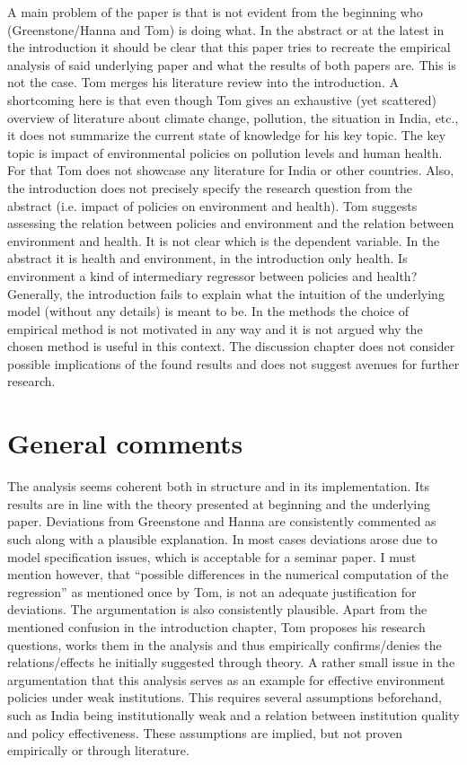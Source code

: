 \documentclass[11pt]{article}
\begin{document}
A main problem of the paper is that is not evident from the beginning who (Greenstone/Hanna and Tom) is doing what. In the abstract or at the latest in the introduction it should be clear that this paper tries to recreate the empirical analysis of said underlying paper and what the results of both papers are. This is not the case. 
Tom merges his literature review into the introduction. A shortcoming here is that even though Tom gives an exhaustive (yet scattered) overview of literature about climate change, pollution, the situation in India, etc., it does not summarize the current state of knowledge for his key topic. The key topic is impact of environmental policies on pollution levels and human health. For that Tom does not showcase any literature for India or other countries. 
Also, the introduction does not precisely specify the research question from the abstract (i.e. impact of policies on environment and health). Tom suggests assessing the relation between policies and environment and the relation between environment and health. It is not clear which is the dependent variable. In the abstract it is health and environment, in the introduction only health. Is environment a kind of intermediary regressor between policies and health? Generally, the introduction fails to explain what the intuition of the underlying model (without any details) is meant to be. 
In the methods the choice of empirical method is not motivated in any way and it is not argued why the chosen method is useful in this context.
The discussion chapter does not consider possible implications of the found results and does not suggest avenues for further research.


\section{General comments}
The analysis seems coherent both in structure and in its implementation. Its results are in line with the theory presented at beginning and the underlying paper. Deviations from Greenstone and Hanna are consistently commented as such along with a plausible explanation. In most cases deviations arose due to model specification issues, which is acceptable for a seminar paper. I must mention however, that “possible differences in the numerical computation of the regression” as mentioned once by Tom, is not an adequate justification for deviations. 
The argumentation is also consistently plausible. Apart from the mentioned confusion in the introduction chapter, Tom proposes his research questions, works them in the analysis and thus empirically confirms/denies the relations/effects he initially suggested through theory. A rather small issue in the argumentation that this analysis serves as an example for effective environment policies under weak institutions. This requires several assumptions beforehand, such as India being institutionally weak and a relation between institution quality and policy effectiveness. These assumptions are implied, but not proven empirically or through literature.
\end{document}
